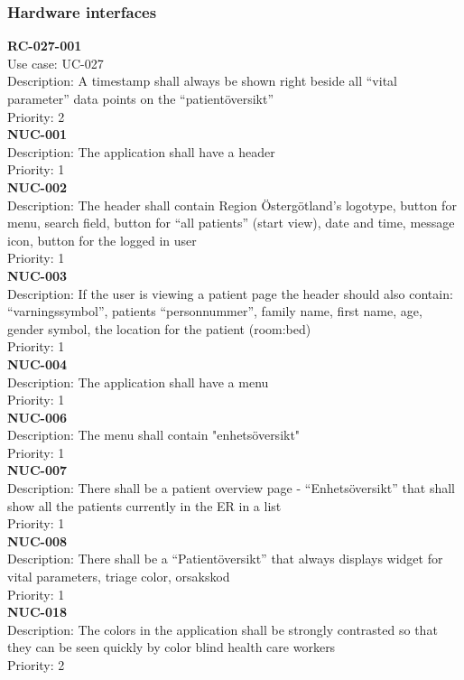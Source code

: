 \subsubsection{Hardware interfaces}
\textbf{RC-027-001} \\
Use case: UC-027 \\
Description: A timestamp shall always be shown right beside all “vital parameter” data points on the “patientöversikt” \\
Priority: 2 \\
\newline
\textbf{NUC-001} \\
Description: The application shall have a header \\
Priority: 1 \\
\newline
\textbf{NUC-002} \\
Description: The header shall contain Region Östergötland's logotype, button for menu, search field, button for “all patients” (start view), date and time, message icon, button for the logged in user\\
Priority: 1 \\
\newline
\textbf{NUC-003} \\
Description: If the user is viewing a patient page the header should also contain: “varningssymbol”, patients “personnummer”, family name, first name, age, gender symbol, the location for the patient (room:bed)\\
Priority: 1 \\
\newline
\textbf{NUC-004} \\
Description: The application shall have a menu \\
Priority: 1 \\
\newline
\textbf{NUC-006} \\
Description: The menu shall contain "enhetsöversikt"\\
Priority: 1 \\
\newline
\textbf{NUC-007} \\
Description: There shall be a patient overview page - “Enhetsöversikt” that shall show all the patients currently in the ER in a list\\
Priority: 1 \\
\newline
\textbf{NUC-008} \\
Description: There shall be a “Patientöversikt” that always displays widget for vital parameters, triage color, orsakskod\\
Priority: 1 \\
\newline
\textbf{NUC-018} \\
Description: The colors in the application shall be strongly contrasted so that they can be seen quickly by color blind health care workers \\
Priority: 2 \\
\newline
